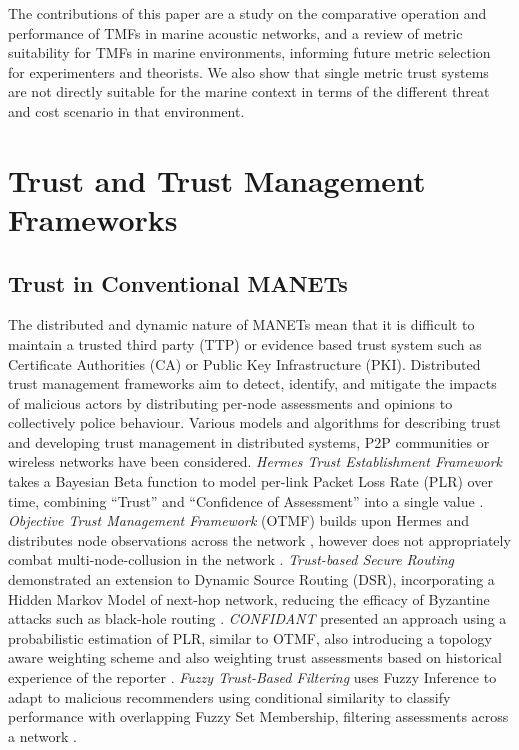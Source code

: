 \documentclass[conference]{IEEEtran}
\begin{document}
The contributions of this paper are a study on the comparative operation and performance of TMFs in marine acoustic networks, and a review of metric suitability for TMFs in marine environments, informing future metric selection for experimenters and theorists.
We also show that single metric trust systems are not directly suitable for the marine context in terms of the different threat and cost scenario in that environment.



\section{Trust and Trust Management Frameworks}\label{sec:trustandtmfs}


\subsection{Trust in Conventional MANETs}\label{sec:trustinmanets}

The distributed and dynamic nature of MANETs mean that it is difficult to maintain a trusted third party (TTP) or evidence based trust system such as Certificate Authorities (CA) or Public Key Infrastructure (PKI).
Distributed trust management frameworks aim to detect, identify, and mitigate the impacts of malicious actors by distributing per-node assessments and opinions to collectively police behaviour.
Various models and algorithms for describing trust and developing trust management in distributed systems, P2P communities or wireless networks have been considered.
\emph{Hermes Trust Establishment Framework} takes a Bayesian Beta function to model per-link Packet Loss Rate (PLR) over time, combining ``Trust'' and ``Confidence of Assessment'' into a single value \cite{Zouridaki2005}.
\emph{Objective Trust Management Framework} (OTMF) builds upon Hermes and distributes node observations across the network \cite{Li2008}, however does not appropriately combat multi-node-collusion in the network \cite{Cho2011}.
\emph{Trust-based Secure Routing} demonstrated an extension to Dynamic Source Routing (DSR), incorporating a Hidden Markov Model of next-hop network, reducing the efficacy of Byzantine attacks such as black-hole routing  \cite{Moe2008a}.
\emph{CONFIDANT} presented an approach using a probabilistic estimation of PLR, similar to OTMF, also introducing a topology aware weighting scheme and also weighting trust assessments based on historical experience of the reporter \cite{Buchegger2002}.
\emph{Fuzzy Trust-Based Filtering} uses Fuzzy Inference to adapt to malicious recommenders using conditional similarity to classify performance with overlapping Fuzzy Set Membership, filtering assessments across a network \cite{Luo2008}. 
\end{document}
